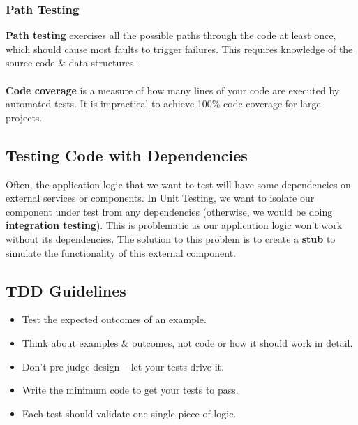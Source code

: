 \documentclass[a4paper,11pt]{article}
\begin{document}
\subsubsection{Path Testing}
\textbf{Path testing} exercises all the possible paths through the code at least once, which should cause most faults to 
trigger failures. 
This requires knowledge of the source code \& data structures.
\\\\ 
\textbf{Code coverage} is a measure of how many lines of your code are executed by automated tests. 
It is impractical to achieve 100\% code coverage for large projects.

\subsection{Testing Code with Dependencies}
Often, the application logic that we want to test will have some dependencies on external services or components. 
In Unit Testing, we want to isolate our component under test from any dependencies (otherwise, we would be doing 
\textbf{integration testing}). 
This is problematic as our application logic won't work without its dependencies. 
The solution to this problem is to create a \textbf{stub} to simulate the functionality of this external component.

\subsection{TDD Guidelines}
\begin{itemize}
    \item   Test the expected outcomes of an example.
    \item   Think about examples \& outcomes, not code or how it should work in detail.
    \item   Don't pre-judge design -- let your tests drive it. 
    \item   Write the minimum code to get your tests to pass. 
    \item   Each test should validate one single piece of logic.
\end{itemize}
\end{document}
